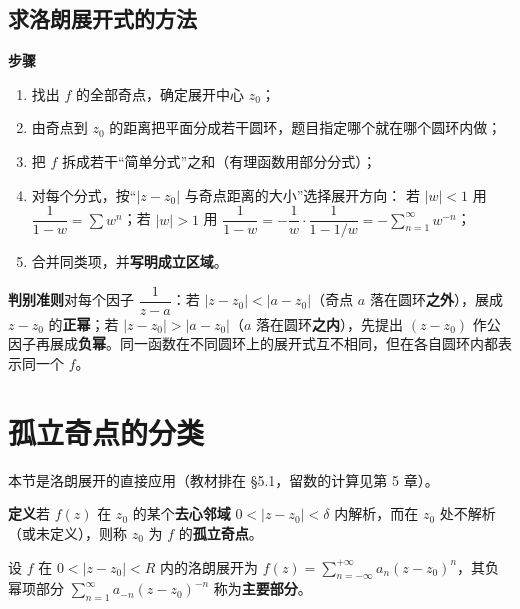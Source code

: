 \subsection{求洛朗展开式的方法}
\textbf{步骤}
\begin{enumerate}[leftmargin=2em]
  \item 找出 \(f\) 的全部奇点，确定展开中心 \(z_{0}\)；
  \item 由奇点到 \(z_{0}\) 的距离把平面分成若干圆环，题目指定哪个就在哪个圆环内做；
  \item 把 \(f\) 拆成若干“简单分式”之和（有理函数用部分分式）；
  \item 对每个分式，按“\(|z-z_{0}|\) 与奇点距离的大小”选择展开方向：
  若 \(|w|<1\) 用 \(\dfrac{1}{1-w}=\sum w^{n}\)；若 \(|w|>1\) 用 \(\dfrac{1}{1-w}=-\dfrac{1}{w}\cdot\dfrac{1}{1-1/w}=-\sum\limits_{n=1}^{\infty}w^{-n}\)；
  \item 合并同类项，并\textbf{写明成立区域}。
\end{enumerate}

\textbf{判别准则}\quad 对每个因子 \(\dfrac{1}{z-a}\)：若 \(|z-z_{0}|<|a-z_{0}|\)（奇点 \(a\) 落在圆环\textbf{之外}），展成 \(z-z_{0}\) 的\textbf{正幂}；若 \(|z-z_{0}|>|a-z_{0}|\)（\(a\) 落在圆环\textbf{之内}），先提出 \((z-z_{0})\) 作公因子再展成\textbf{负幂}。同一函数在不同圆环上的展开式互不相同，但在各自圆环内都表示同一个 \(f\)。


\section{孤立奇点的分类}

本节是洛朗展开的直接应用（教材排在 §5.1，留数的计算见第 5 章）。

\textbf{定义}\quad 若 \(f(z)\) 在 \(z_{0}\) 的某个\textbf{去心邻域} \(0<|z-z_{0}|<\delta\) 内解析，而在 \(z_{0}\) 处不解析（或未定义），则称 \(z_{0}\) 为 \(f\) 的\textbf{孤立奇点}。

设 \(f\) 在 \(0<|z-z_{0}|<R\) 内的洛朗展开为 \(f(z)=\sum\limits_{n=-\infty}^{+\infty}a_{n}(z-z_{0})^{n}\)，其负幂项部分 \(\sum\limits_{n=1}^{\infty}a_{-n}(z-z_{0})^{-n}\) 称为\textbf{主要部分}。

